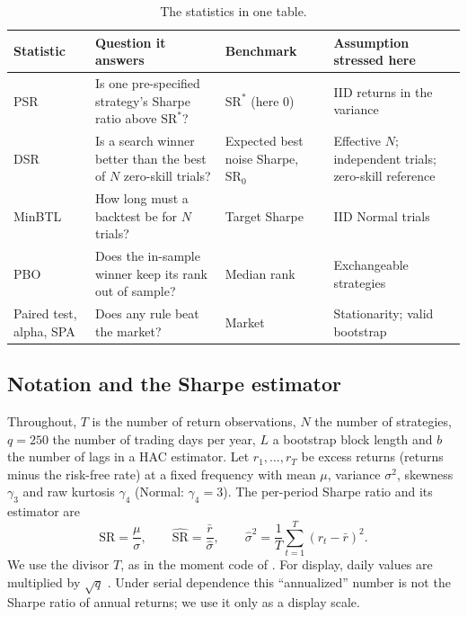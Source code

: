 \documentclass[11pt,a4paper]{article}
\newcommand{\SR}{\mathrm{SR}}
\newcommand{\hSR}{\widehat{\mathrm{SR}}}
\begin{document}
\begin{table}[htbp]
\centering\small
\caption{The statistics in one table.}\label{tab:stats}
\begin{tabularx}{\textwidth}{@{}>{\raggedright\arraybackslash}p{1.6cm}>{\raggedright\arraybackslash}X>{\raggedright\arraybackslash}p{3.3cm}>{\raggedright\arraybackslash}p{3.6cm}@{}}
\toprule
Statistic & Question it answers & Benchmark & Assumption stressed here \\
\midrule
PSR & Is one pre-specified strategy's Sharpe ratio above $\SR^\ast$? & $\SR^\ast$ (here 0) & IID returns in the variance \\
DSR & Is a search winner better than the best of $N$ zero-skill trials? & Expected best noise Sharpe, $\SR_0$ & Effective $N$; independent trials; zero-skill reference \\
MinBTL & How long must a backtest be for $N$ trials? & Target Sharpe & IID Normal trials \\
PBO & Does the in-sample winner keep its rank out of sample? & Median rank & Exchangeable strategies \\
Paired test, alpha, SPA & Does any rule beat the market? & Market & Stationarity; valid bootstrap \\
\bottomrule
\end{tabularx}
\end{table}

\subsection{Notation and the Sharpe estimator}
Throughout, $T$ is the number of return observations, $N$ the number of strategies, $q=250$ the number of trading days per year, $L$ a bootstrap block length and $b$ the number of lags in a HAC estimator. Let $r_1,\dots,r_T$ be excess returns (returns minus the risk-free rate) at a fixed frequency with mean $\mu$, variance $\sigma^2$, skewness $\gamma_3$ and raw kurtosis $\gamma_4$ (Normal: $\gamma_4=3$). The per-period Sharpe ratio and its estimator are
\begin{equation}\label{eq:sr}
\SR=\frac{\mu}{\sigma},\qquad \hSR=\frac{\bar r}{\hat\sigma},\qquad \hat\sigma^2=\frac1T\sum_{t=1}^T(r_t-\bar r)^2 .
\end{equation}
We use the divisor $T$, as in the moment code of \citet[App.~A.4]{bailey2012frontier}. For display, daily values are multiplied by $\sqrt q$ \citep[p.~10]{bailey2014dsr}. Under serial dependence this ``annualized'' number is not the Sharpe ratio of annual returns; we use it only as a display scale.
\end{document}
